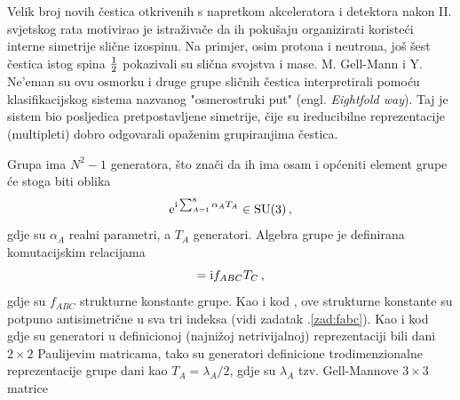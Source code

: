 Velik broj novih čestica otkrivenih s napretkom akceleratora i detektora nakon
II. svjetskog rata motivirao je istraživače da ih pokušaju organizirati
koristeći interne simetrije slične izospinu. Na primjer, osim protona i
neutrona, još šest čestica istog spina $\frac{1}{2}$ pokazivali su slična
svojstva i mase. M. Gell-Mann i Y. Ne'eman su ovu osmorku i druge grupe
sličnih čestica interpretirali pomoću klasifikacijskog sistema nazvanog
"osmerostruki put" (engl. \emph{Eightfold way}). Taj je sistem bio posljedica
pretpostavljene  simetrije, čije su ireducibilne reprezentacije (multipleti) dobro
odgovarali opaženim grupiranjima čestica.
 

Grupa  ima $N^2-1$ generatora, što znači da ih  ima osam i
općeniti element grupe će stoga biti oblika
\begin{equation}
    \textrm{e}^{\textrm{i} \sum_{A=1}^8 \alpha_A T_{A}} \in \mathrm{SU}(3) \,,
    \label{eq:elsu3}
\end{equation}
gdje su $\alpha_A$ realni parametri, a $T_A$ generatori. Algebra grupe je
definirana komutacijskim relacijama
\begin{equation}
  [ T_{A}, T_{B} ] = \rmi f_{ABC} T_C \,,
\label{eq:SU3}
\end{equation}
gdje su $f_{ABC}$ strukturne konstante grupe. Kao i kod , ove strukturne
konstante su potpuno antisimetrične u sva tri indeksa (vidi zadatak \thechapter.\ref{zad:fabc}).
Kao i kod  gdje su generatori u definicionoj (najnižoj netrivijalnoj)
reprezentaciji bili dani $2\times 2$ Paulijevim matricama, tako su generatori
definicione trodimenzionalne reprezentacije grupe  dani kao
$T_A = \lambda_A/2$, gdje su $\lambda_A$ tzv. Gell-Mannove $3\times 3$ matrice
